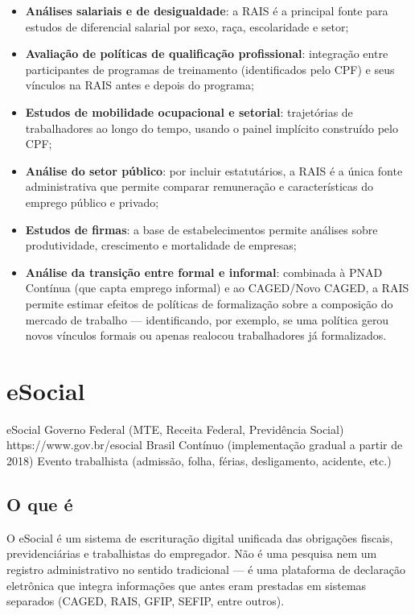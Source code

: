 \begin{itemize}
  \item \textbf{Análises salariais e de desigualdade}: a RAIS é a principal fonte para estudos de diferencial salarial por sexo, raça, escolaridade e setor;
  \item \textbf{Avaliação de políticas de qualificação profissional}: integração entre participantes de programas de treinamento (identificados pelo CPF) e seus vínculos na RAIS antes e depois do programa;
  \item \textbf{Estudos de mobilidade ocupacional e setorial}: trajetórias de trabalhadores ao longo do tempo, usando o painel implícito construído pelo CPF;
  \item \textbf{Análise do setor público}: por incluir estatutários, a RAIS é a única fonte administrativa que permite comparar remuneração e características do emprego público e privado;
  \item \textbf{Estudos de firmas}: a base de estabelecimentos permite análises sobre produtividade, crescimento e mortalidade de empresas;
  \item \textbf{Análise da transição entre formal e informal}: combinada à PNAD Contínua (que capta emprego informal) e ao CAGED/Novo CAGED, a RAIS permite estimar efeitos de políticas de formalização sobre a composição do mercado de trabalho --- identificando, por exemplo, se uma política gerou novos vínculos formais ou apenas realocou trabalhadores já formalizados.
\end{itemize}

\section{eSocial}

\ficharapida
  {eSocial}
  {Governo Federal (MTE, Receita Federal, Previdência Social)}
  {https://www.gov.br/esocial}
  {Brasil}
  {Contínuo (implementação gradual a partir de 2018)}
  {Evento trabalhista (admissão, folha, férias, desligamento, acidente, etc.)}

\subsection{O que é}

O eSocial é um sistema de escrituração digital unificada das obrigações fiscais, previdenciárias e trabalhistas do empregador. Não é uma pesquisa nem um registro administrativo no sentido tradicional — é uma plataforma de declaração eletrônica que integra informações que antes eram prestadas em sistemas separados (CAGED, RAIS, GFIP, SEFIP, entre outros).

